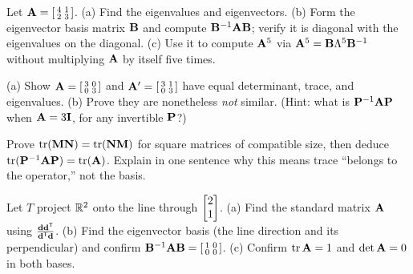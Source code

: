 \begin{exercise}
\label{ch31:ex-diag}
Let $\mathbf{A}=\begin{bsmallmatrix}4&1\\2&3\end{bsmallmatrix}$. (a) Find the
eigenvalues and eigenvectors. (b) Form the eigenvector basis matrix $\mathbf{B}$ and
compute $\mathbf{B}^{-1}\mathbf{A}\mathbf{B}$; verify it is diagonal with the eigenvalues on
the diagonal. (c) Use it to compute $\mathbf{A}^{5}$ via
$\mathbf{A}^5=\mathbf{B}\Lambda^5\mathbf{B}^{-1}$ without multiplying $\mathbf{A}$ by itself
five times.
\end{exercise}

\begin{exercise}
\label{ch31:ex-invariants}
(a) Show $\mathbf{A}=\begin{bsmallmatrix}3&0\\0&3\end{bsmallmatrix}$ and
$\mathbf{A}'=\begin{bsmallmatrix}3&1\\0&3\end{bsmallmatrix}$ have equal determinant,
trace, and eigenvalues. (b) Prove they are nonetheless \emph{not} similar.
(Hint: what is $\mathbf{P}^{-1}\mathbf{A}\mathbf{P}$ when $\mathbf{A}=3\mathbf{I}$, for any
invertible $\mathbf{P}$?)
\end{exercise}

\begin{exercise}
\label{ch31:ex-trace}
Prove $\operatorname{tr}(\mathbf{M}\mathbf{N})=\operatorname{tr}(\mathbf{N}\mathbf{M})$ for square matrices of compatible
size, then deduce $\operatorname{tr}(\mathbf{P}^{-1}\mathbf{A}\mathbf{P})=\operatorname{tr}(\mathbf{A})$. Explain in one
sentence why this means trace ``belongs to the operator,'' not the basis.
\end{exercise}

\begin{exercise}
\label{ch31:ex-proj-three}
Let $T$ project $\mathbb{R}^2$ onto the line through $\begin{bmatrix}2\\1\end{bmatrix}$. (a) Find the standard
matrix $\mathbf{A}$ using $\frac{\mathbf{d}\mathbf{d}^{\mathsf{T}}}{\mathbf{d}^{\mathsf{T}}\mathbf{d}}$. (b) Find the
eigenvector basis (the line direction and its perpendicular) and confirm
$\mathbf{B}^{-1}\mathbf{A}\mathbf{B}=\begin{bsmallmatrix}1&0\\0&0\end{bsmallmatrix}$.
(c) Confirm $\operatorname{tr}\mathbf{A}=1$ and $\det\mathbf{A}=0$ in both bases.
\end{exercise}

